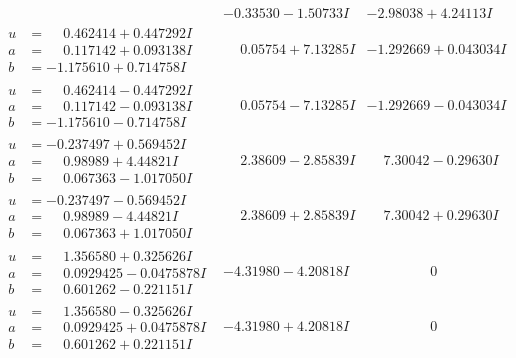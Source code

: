 \documentclass[1p]{elsarticle_modified}
\theoremstyle{definition}
\begin{document}
$$\begin{array}{c|c|c}
 & -0.33530 - 1.50733 I & -2.98038 + 4.24113 I \\ \hline\begin{aligned}
u &= \phantom{-}0.462414 + 0.447292 I \\
a &= \phantom{-}0.117142 + 0.093138 I \\
b &= -1.175610 + 0.714758 I\end{aligned}
 & \phantom{-}0.05754 + 7.13285 I & -1.292669 + 0.043034 I \\ \hline\begin{aligned}
u &= \phantom{-}0.462414 - 0.447292 I \\
a &= \phantom{-}0.117142 - 0.093138 I \\
b &= -1.175610 - 0.714758 I\end{aligned}
 & \phantom{-}0.05754 - 7.13285 I & -1.292669 - 0.043034 I \\ \hline\begin{aligned}
u &= -0.237497 + 0.569452 I \\
a &= \phantom{-}0.98989 + 4.44821 I \\
b &= \phantom{-}0.067363 - 1.017050 I\end{aligned}
 & \phantom{-}2.38609 - 2.85839 I & \phantom{-}7.30042 - 0.29630 I \\ \hline\begin{aligned}
u &= -0.237497 - 0.569452 I \\
a &= \phantom{-}0.98989 - 4.44821 I \\
b &= \phantom{-}0.067363 + 1.017050 I\end{aligned}
 & \phantom{-}2.38609 + 2.85839 I & \phantom{-}7.30042 + 0.29630 I \\ \hline\begin{aligned}
u &= \phantom{-}1.356580 + 0.325626 I \\
a &= \phantom{-}0.0929425 - 0.0475878 I \\
b &= \phantom{-}0.601262 - 0.221151 I\end{aligned}
 & -4.31980 - 4.20818 I & \phantom{-0.000000 } 0 \\ \hline\begin{aligned}
u &= \phantom{-}1.356580 - 0.325626 I \\
a &= \phantom{-}0.0929425 + 0.0475878 I \\
b &= \phantom{-}0.601262 + 0.221151 I\end{aligned}
 & -4.31980 + 4.20818 I & \phantom{-0.000000 } 0 \\ \hline\begin{aligned}

\end{aligned}
\end{array}$$
\end{document}
